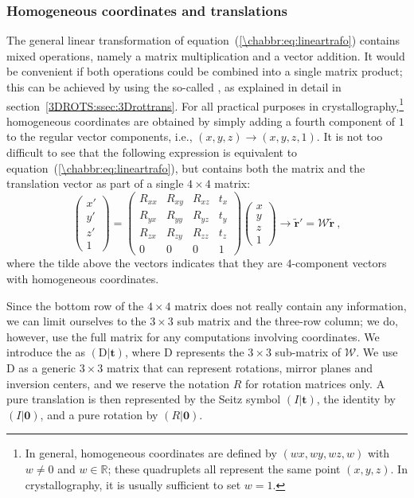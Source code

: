 \subsubsection{Homogeneous coordinates and translations}
The general linear transformation of equation~(\ref{\chabbr:eq:lineartrafo}) contains mixed operations, namely a matrix multiplication and a vector addition.  It would be convenient if both operations could be combined into a single matrix product; this can be achieved by using the so-called , as explained in detail in section~\ref{3DROTS:ssec:3Drottrans}. For all practical purposes in crystallography,\footnote{In general, homogeneous coordinates are defined by $(wx,wy,wz,w)$ with $w\ne 0$ and $w\in\mathbb{R}$; these quadruplets all represent the same point $(x,y,z)$.  In crystallography, it is usually sufficient to set $w=1$.} homogeneous coordinates are obtained by simply adding a fourth component of $1$ to the regular vector components, i.e., $(x,y,z)\rightarrow(x,y,z,1)$. It is not too difficult to see that the following expression is equivalent to  equation~(\ref{\chabbr:eq:lineartrafo}), but contains both the matrix and the translation vector as part of a single $4\times 4$ matrix:
\begin{equation}
	\begin{pmatrix}x'\\ y'\\ z'\\ 1\end{pmatrix} = \begin{pmatrix} R_{xx}&R_{xy}&R_{xz}&t_x\\ R_{yx}&R_{yy}&R_{yz}&t_y\\ R_{zx}&R_{zy}&R_{zz}&t_z\\ 0&0&0&1\end{pmatrix} \begin{pmatrix}x\\ y\\ z\\ 1\end{pmatrix}\rightarrow \tilde{\mathbf{r}}' = \mathcal{W}\tilde{\mathbf{r}}\ ,	
\end{equation}
where the tilde above the vectors indicates that they are $4$-component vectors with homogeneous coordinates.

Since the bottom row of the $4\times 4$ matrix does not really contain any information, we can limit ourselves to the $3\times 3$ sub matrix and the three-row column; we do, however, use the full matrix for any computations involving coordinates.  We introduce the  as $(\mathrm{D}\vert\mathbf{t})$, where $\mathrm{D}$ represents the $3\times 3$ sub-matrix of $\mathcal{W}$. We use $\mathrm{D}$ as a generic $3\times 3$ matrix that can represent rotations, mirror planes and inversion centers, and we reserve the notation $R$ for rotation matrices only.  A pure translation is then represented by the Seitz symbol $(I\vert\mathbf{t})$, the identity by $(I\vert\mathbf{0})$, and a pure rotation by $(R\vert\mathbf{0})$.  

